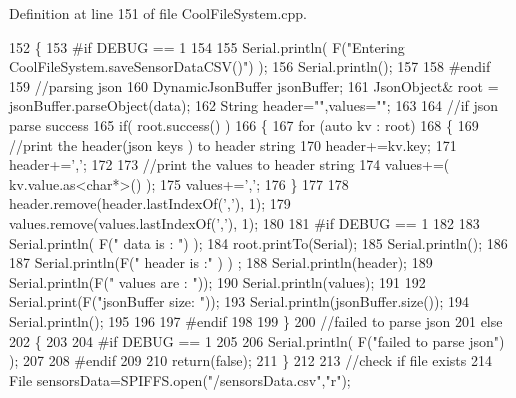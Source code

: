 Definition at line 151 of file Cool\+File\+System.\+cpp.


\begin{DoxyCode}
152 \{
153 \textcolor{preprocessor}{#if DEBUG == 1}
154 
155     Serial.println( F(\textcolor{stringliteral}{"Entering CoolFileSystem.saveSensorDataCSV()"}) );
156     Serial.println();
157 
158 \textcolor{preprocessor}{#endif}
159     \textcolor{comment}{//parsing json}
160     DynamicJsonBuffer jsonBuffer;
161     JsonObject& root = jsonBuffer.parseObject(data);
162     String header=\textcolor{stringliteral}{""},values=\textcolor{stringliteral}{""};
163     
164     \textcolor{comment}{//if json parse success}
165     \textcolor{keywordflow}{if}( root.success() )
166     \{       
167         \textcolor{keywordflow}{for} (\textcolor{keyword}{auto} kv : root) 
168         \{
169             \textcolor{comment}{//print the header(json keys ) to header string}
170             header+=kv.key;
171             header+=\textcolor{charliteral}{','};
172             
173             \textcolor{comment}{//print the values to header string}
174             values+=( kv.value.as<\textcolor{keywordtype}{char}*>() );
175             values+=\textcolor{charliteral}{','};
176         \}
177 
178         header.remove(header.lastIndexOf(\textcolor{charliteral}{','}), 1);
179         values.remove(values.lastIndexOf(\textcolor{charliteral}{','}), 1);      
180     
181 \textcolor{preprocessor}{    #if DEBUG == 1}
182     
183         Serial.println( F(\textcolor{stringliteral}{" data is : "}) );
184         root.printTo(Serial);
185         Serial.println();
186         
187         Serial.println(F(\textcolor{stringliteral}{" header is :"} ) ) ;
188         Serial.println(header);
189         Serial.println(F(\textcolor{stringliteral}{" values are : "}));
190         Serial.println(values);
191         
192         Serial.print(F(\textcolor{stringliteral}{"jsonBuffer size: "}));
193         Serial.println(jsonBuffer.size());
194         Serial.println();
195 
196     
197 \textcolor{preprocessor}{    #endif}
198     
199     \}
200     \textcolor{comment}{//failed to parse json}
201     \textcolor{keywordflow}{else}
202     \{
203     
204 \textcolor{preprocessor}{    #if DEBUG == 1}
205 
206         Serial.println( F(\textcolor{stringliteral}{"failed to parse json"}) );
207     
208 \textcolor{preprocessor}{    #endif}
209 
210         \textcolor{keywordflow}{return}(\textcolor{keyword}{false});
211     \}
212 
213     \textcolor{comment}{//check if file exists}
214     File sensorsData=SPIFFS.open(\textcolor{stringliteral}{"/sensorsData.csv"},\textcolor{stringliteral}{"r"});

\end{DoxyCode}
